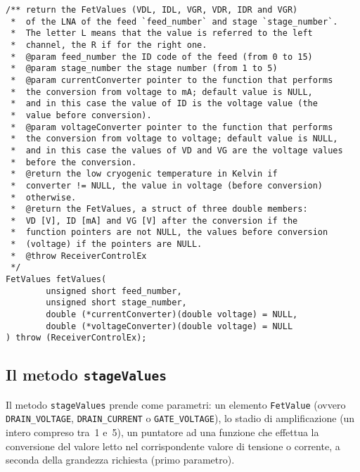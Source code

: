 \begin{lstlisting}[caption={Dichiarazione del metodo \texttt{fetValues}},
label=lst:fetValues,mathescape]
/** return the FetValues (VDL, IDL, VGR, VDR, IDR and VGR) 
 *  of the LNA of the feed `feed_number` and stage `stage_number`. 
 *  The letter L means that the value is referred to the left 
 *  channel, the R if for the right one.
 *  @param feed_number the ID code of the feed (from 0 to 15)
 *  @param stage_number the stage number (from 1 to 5)
 *  @param currentConverter pointer to the function that performs 
 *  the conversion from voltage to mA; default value is NULL, 
 *  and in this case the value of ID is the voltage value (the 
 *  value before conversion).
 *  @param voltageConverter pointer to the function that performs 
 *  the conversion from voltage to voltage; default value is NULL, 
 *  and in this case the values of VD and VG are the voltage values 
 *  before the conversion.
 *  @return the low cryogenic temperature in Kelvin if 
 *  converter != NULL, the value in voltage (before conversion) 
 *  otherwise.
 *  @return the FetValues, a struct of three double members: 
 *  VD [V], ID [mA] and VG [V] after the conversion if the 
 *  function pointers are not NULL, the values before conversion 
 *  (voltage) if the pointers are NULL.
 *  @throw ReceiverControlEx
 */
FetValues fetValues(
        unsigned short feed_number, 
        unsigned short stage_number,
        double (*currentConverter)(double voltage) = NULL,
        double (*voltageConverter)(double voltage) = NULL
) throw (ReceiverControlEx);
\end{lstlisting}
\lstset{numbers=none}


\subsection{Il metodo \texttt{stageValues}}
Il metodo \texttt{stageValues} prende come parametri: un elemento \texttt{FetValue} (ovvero
\texttt{DRAIN\_VOLTAGE}, \texttt{DRAIN\_CURRENT} o 
\texttt{GATE\_VOLTAGE}), lo stadio
di amplificazione (un intero compreso tra~1 e~5), un puntatore ad una funzione che effettua
la conversione del valore letto nel corrispondente valore di tensione o corrente, a seconda
della grandezza richiesta (primo parametro).

